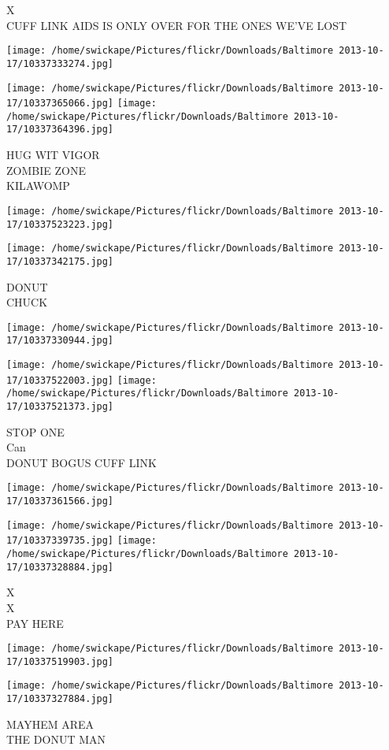 \documentclass[10pt,letterpaper]{article}
\begin{document}
X\\
CUFF LINK AIDS IS ONLY OVER FOR THE ONES WE'VE LOST
\pagebreak

\texttt{[image: /home/swickape/Pictures/flickr/Downloads/Baltimore 2013-10-17/10337333274.jpg]}

\vspace{0.25in}
\texttt{[image: /home/swickape/Pictures/flickr/Downloads/Baltimore 2013-10-17/10337365066.jpg]}
\texttt{[image: /home/swickape/Pictures/flickr/Downloads/Baltimore 2013-10-17/10337364396.jpg]}

HUG WIT VIGOR\\
ZOMBIE ZONE\\
KILAWOMP
\pagebreak

\texttt{[image: /home/swickape/Pictures/flickr/Downloads/Baltimore 2013-10-17/10337523223.jpg]}

\vspace{0.25in}
\texttt{[image: /home/swickape/Pictures/flickr/Downloads/Baltimore 2013-10-17/10337342175.jpg]}

DONUT\\
CHUCK
\pagebreak

\texttt{[image: /home/swickape/Pictures/flickr/Downloads/Baltimore 2013-10-17/10337330944.jpg]}

\vspace{0.25in}
\texttt{[image: /home/swickape/Pictures/flickr/Downloads/Baltimore 2013-10-17/10337522003.jpg]}
\texttt{[image: /home/swickape/Pictures/flickr/Downloads/Baltimore 2013-10-17/10337521373.jpg]}

STOP ONE\\
Can\\
DONUT BOGUS CUFF LINK
\pagebreak

\texttt{[image: /home/swickape/Pictures/flickr/Downloads/Baltimore 2013-10-17/10337361566.jpg]}

\vspace{0.25in}
\texttt{[image: /home/swickape/Pictures/flickr/Downloads/Baltimore 2013-10-17/10337339735.jpg]}
\texttt{[image: /home/swickape/Pictures/flickr/Downloads/Baltimore 2013-10-17/10337328884.jpg]}

X\\
X\\
PAY HERE
\pagebreak

\texttt{[image: /home/swickape/Pictures/flickr/Downloads/Baltimore 2013-10-17/10337519903.jpg]}

\vspace{0.25in}
\texttt{[image: /home/swickape/Pictures/flickr/Downloads/Baltimore 2013-10-17/10337327884.jpg]}

MAYHEM AREA\\
THE DONUT MAN
\pagebreak
\end{document}

